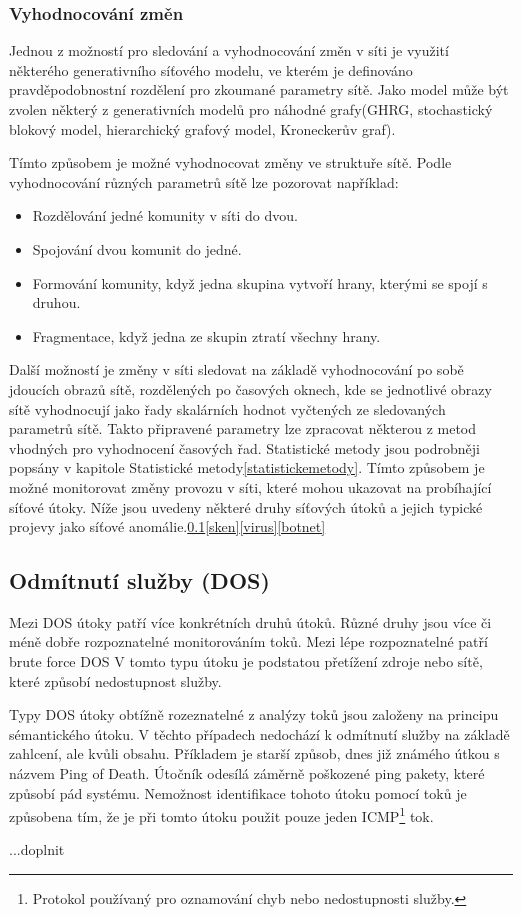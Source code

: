 \documentclass[thesis=M,czech]{FITthesis}[2012/06/26]
\begin{document}
\subsubsection{Vyhodnocování změn}
Jednou z možností pro sledování a vyhodnocování změn v síti je využití některého generativního síťového modelu, ve kterém je definováno pravděpodobnostní rozdělení pro zkoumané parametry sítě. Jako model může být zvolen některý z generativních modelů pro náhodné grafy(GHRG, stochastický blokový model, hierarchický grafový model, Kroneckerův graf).\cite{graphmodels}\cite{kronecker}\cite{structurechange}\par Tímto způsobem je možné vyhodnocovat změny ve struktuře sítě. Podle vyhodnocování různých parametrů sítě lze pozorovat například:
\begin{itemize}
	\item Rozdělování jedné komunity v síti do dvou.
	\item Spojování dvou komunit do jedné.
	\item Formování komunity, když jedna skupina vytvoří hrany, kterými se spojí s druhou.
	\item Fragmentace, když jedna ze skupin ztratí všechny hrany.
\end{itemize} 
Další možností je změny v síti sledovat na základě vyhodnocování po sobě jdoucích obrazů sítě, rozdělených po časových oknech, kde se jednotlivé obrazy sítě vyhodnocují jako řady skalárních hodnot vyčtených ze sledovaných parametrů sítě. Takto připravené parametry lze zpracovat některou z metod vhodných pro vyhodnocení časových řad.\cite{cumulativestructurechange} Statistické metody jsou podrobněji popsány v kapitole Statistické metody\ref{statistickemetody}. Tímto způsobem je možné monitorovat změny provozu v síti, které mohou ukazovat na probíhající síťové útoky.
Níže jsou uvedeny některé druhy síťových útoků a jejich typické projevy jako síťové anomálie.\ref{dos}\ref{sken}\ref{virus}\ref{botnet}
\subsection{Odmítnutí služby (DOS)}
\label{dos}
Mezi DOS útoky patří více konkrétních druhů útoků. Různé druhy jsou více či méně dobře rozpoznatelné monitorováním toků. Mezi lépe rozpoznatelné patří brute force DOS V tomto typu útoku je podstatou přetížení zdroje nebo sítě, které způsobí nedostupnost služby.\par
Typy DOS útoky obtížně rozeznatelné z analýzy toků jsou založeny na principu sémantického útoku. V těchto případech nedochází k odmítnutí služby na základě zahlcení, ale kvůli obsahu. Příkladem je starší způsob, dnes již známého útkou s názvem Ping of Death. Útočník odesílá záměrně poškozené ping pakety, které způsobí pád systému. Nemožnost identifikace tohoto útoku pomocí toků je způsobena tím, že je při tomto útoku použit pouze jeden ICMP\footnote{Protokol používaný pro oznamování chyb nebo nedostupnosti služby.} tok.
\par...doplnit
\end{document}
